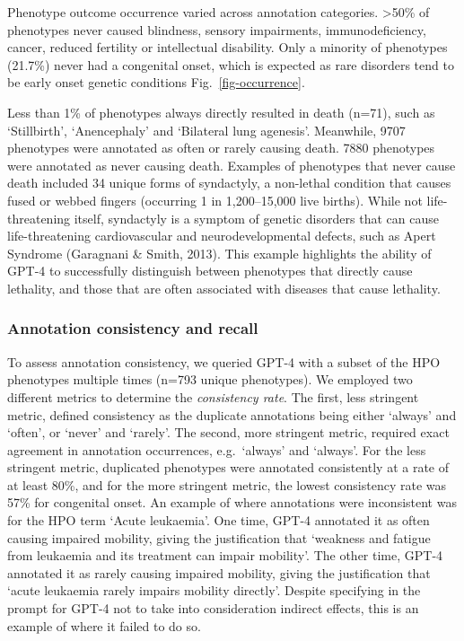 \documentclass[
]{agujournal2019}
\begin{document}
Phenotype outcome occurrence varied across annotation categories.
\textgreater50\% of phenotypes never caused blindness, sensory
impairments, immunodeficiency, cancer, reduced fertility or intellectual
disability. Only a minority of phenotypes (21.7\%) never had a
congenital onset, which is expected as rare disorders tend to be early
onset genetic conditions Fig.~\ref{fig-occurrence}.

Less than 1\% of phenotypes always directly resulted in death (n=71),
such as `Stillbirth', `Anencephaly' and `Bilateral lung agenesis'.
Meanwhile, 9707 phenotypes were annotated as often or rarely causing
death. 7880 phenotypes were annotated as never causing death. Examples
of phenotypes that never cause death included 34 unique forms of
syndactyly, a non-lethal condition that causes fused or webbed fingers
(occurring 1 in 1,200--15,000 live births). While not life-threatening
itself, syndactyly is a symptom of genetic disorders that can cause
life-threatening cardiovascular and neurodevelopmental defects, such as
Apert Syndrome (Garagnani \& Smith, 2013). This example highlights the
ability of GPT-4 to successfully distinguish between phenotypes that
directly cause lethality, and those that are often associated with
diseases that cause lethality.

\subsubsection{Annotation consistency and
recall}\label{annotation-consistency-and-recall}

To assess annotation consistency, we queried GPT-4 with a subset of the
HPO phenotypes multiple times (n=793 unique phenotypes). We employed two
different metrics to determine the \emph{consistency rate}. The first,
less stringent metric, defined consistency as the duplicate annotations
being either `always' and `often', or `never' and `rarely'. The second,
more stringent metric, required exact agreement in annotation
occurrences, e.g.~`always' and `always'. For the less stringent metric,
duplicated phenotypes were annotated consistently at a rate of at least
80\%, and for the more stringent metric, the lowest consistency rate was
57\% for congenital onset. An example of where annotations were
inconsistent was for the HPO term `Acute leukaemia'. One time, GPT-4
annotated it as often causing impaired mobility, giving the
justification that `weakness and fatigue from leukaemia and its
treatment can impair mobility'. The other time, GPT-4 annotated it as
rarely causing impaired mobility, giving the justification that `acute
leukaemia rarely impairs mobility directly'. Despite specifying in the
prompt for GPT-4 not to take into consideration indirect effects, this
is an example of where it failed to do so.
\end{document}
